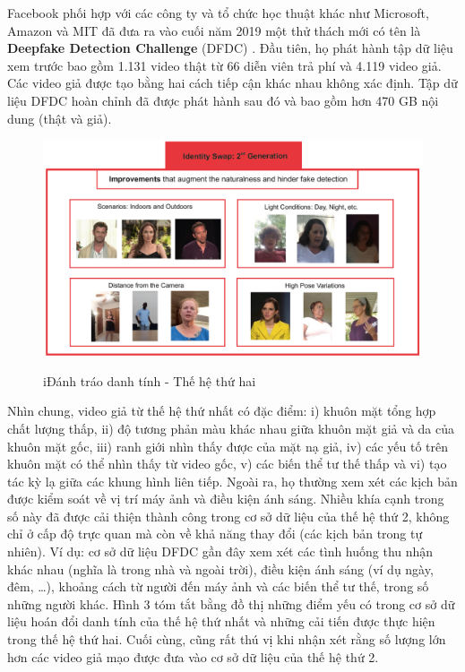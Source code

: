 \documentclass{article}
\begin{document}
Facebook phối hợp với các công ty và tổ chức học thuật khác như Microsoft, Amazon và MIT đã đưa ra vào cuối năm 2019 một thử thách mới có tên là \textbf{Deepfake Detection Challenge} (DFDC) . Đầu tiên, họ phát hành tập dữ liệu xem trước bao gồm 1.131 video thật từ 66 diễn viên trả phí và 4.119 video giả. Các video giả được tạo bằng hai cách tiếp cận khác nhau không xác định. Tập dữ liệu DFDC hoàn chỉnh đã được phát hành sau đó và bao gồm hơn 470 GB nội dung (thật và giả).

\begin{figure}[h!]
\caption{iĐánh tráo danh tính - Thế hệ thứ hai}
\includegraphics[width=\columnwidth]{fig-4-id-swap-gen2}
\label{fig-4-id-swap-gen2}
\end{figure}

Nhìn chung, video giả từ thế hệ thứ nhất có đặc điểm: i) khuôn mặt tổng hợp chất lượng thấp, ii) độ tương phản màu khác nhau giữa khuôn mặt giả và da của khuôn mặt gốc, iii) ranh giới nhìn thấy được của mặt nạ giả, iv) các yếu tố trên khuôn mặt có thể nhìn thấy từ video gốc, v) các biến thể tư thế thấp và vi) tạo tác kỳ lạ giữa các khung hình liên tiếp. Ngoài ra, họ thường xem xét các kịch bản được kiểm soát về vị trí máy ảnh và điều kiện ánh sáng. Nhiều khía cạnh trong số này đã được cải thiện thành công trong cơ sở dữ liệu của thế hệ thứ 2, không chỉ ở cấp độ trực quan mà còn về khả năng thay đổi (các kịch bản trong tự nhiên). Ví dụ: cơ sở dữ liệu DFDC gần đây xem xét các tình huống thu nhận khác nhau (nghĩa là trong nhà và ngoài trời), điều kiện ánh sáng (ví dụ ngày, đêm, …), khoảng cách từ người đến máy ảnh và các biến thể tư thế, trong số những người khác. Hình 3 tóm tắt bằng đồ thị những điểm yếu có trong cơ sở dữ liệu hoán đổi danh tính của thế hệ thứ nhất và những cải tiến được thực hiện trong thế hệ thứ hai. Cuối cùng, cũng rất thú vị khi nhận xét rằng số lượng lớn hơn các video giả mạo được đưa vào cơ sở dữ liệu của thế hệ thứ 2.
\end{document}
